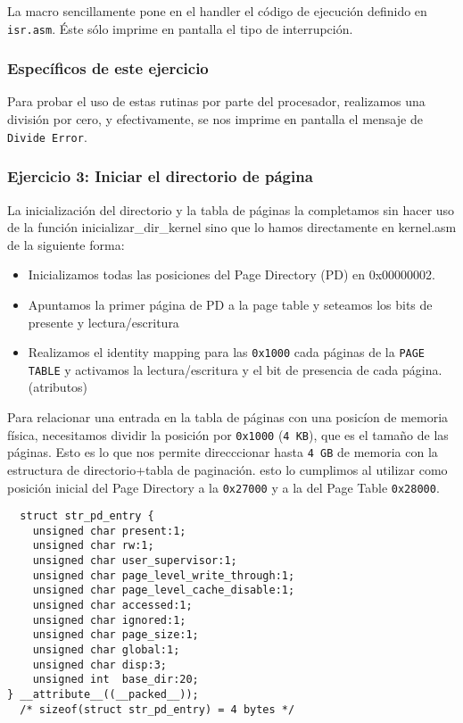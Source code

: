 \documentclass[twocolumn,10pt]{article}
\begin{document}
La macro sencillamente pone en el handler el código de ejecución
definido en \texttt{isr.asm}. Éste sólo imprime en pantalla el tipo de
interrupción.


\subsubsection*{Específicos de este ejercicio}

Para probar el uso de estas rutinas por parte del procesador,
realizamos una división por cero, y efectivamente, se nos imprime en
pantalla el mensaje de \texttt{Divide Error}.


\subsubsection{Ejercicio 3: Iniciar el directorio de página} 

La inicialización del directorio y la tabla de páginas la
completamos sin hacer uso de la funci\'on inicializar\_dir\_kernel
sino que lo hamos directamente en kernel.asm de la siguiente forma:
\begin{itemize}
\item Inicializamos todas las posiciones del Page Directory (PD) en
  0x00000002.
\item Apuntamos la primer página de PD a la page table y seteamos los
  bits de presente y lectura/escritura
\item Realizamos el identity mapping para las \texttt{0x1000} cada
  p\'aginas de la \texttt{PAGE TABLE} y activamos la lectura/escritura
  y el bit de presencia de cada página. (atributos)
\end{itemize}

Para relacionar una entrada en la tabla de páginas con una posicíon de
memoria física, necesitamos dividir la posición por \texttt{0x1000}
(\texttt{4 KB}), que es el tamaño de las páginas. Esto es lo que nos
permite direcccionar hasta \texttt{4 GB} de memoria con la estructura
de directorio+tabla de paginación. esto lo cumplimos al utilizar como
posición inicial del Page Directory a la \texttt{0x27000} y a la del Page Table
\texttt{0x28000}.


\begin{lstlisting}
  struct str_pd_entry {
    unsigned char present:1;
    unsigned char rw:1;
    unsigned char user_supervisor:1;
    unsigned char page_level_write_through:1;
    unsigned char page_level_cache_disable:1;
    unsigned char accessed:1;
    unsigned char ignored:1;
    unsigned char page_size:1;
    unsigned char global:1;
    unsigned char disp:3;
    unsigned int  base_dir:20;
} __attribute__((__packed__));
  /* sizeof(struct str_pd_entry) = 4 bytes */
\end{lstlisting}
\end{document}
